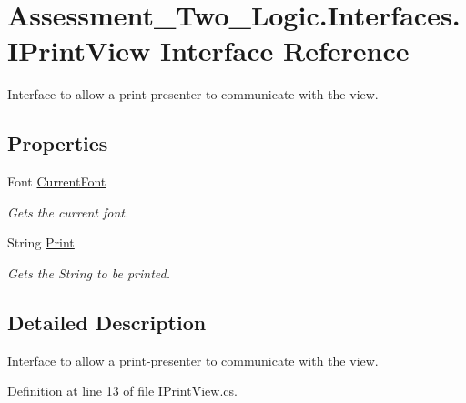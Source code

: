 \hypertarget{interface_assessment___two___logic_1_1_interfaces_1_1_i_print_view}{
\section{Assessment\_\-Two\_\-Logic.Interfaces.IPrintView Interface Reference}
\label{interface_assessment___two___logic_1_1_interfaces_1_1_i_print_view}
}


Interface to allow a print-\/presenter to communicate with the view.  


\subsection*{Properties}
\begin{DoxyCompactItemize}
\item 
Font \hyperlink{interface_assessment___two___logic_1_1_interfaces_1_1_i_print_view_a9368f6ee671be1c540a3d9240f03aed4}{CurrentFont}
\begin{DoxyCompactList}\small\item\em Gets the current font. \item\end{DoxyCompactList}\item 
String \hyperlink{interface_assessment___two___logic_1_1_interfaces_1_1_i_print_view_aae77c0c48f1acccf4fe91b8fd2cd265f}{Print}
\begin{DoxyCompactList}\small\item\em Gets the String to be printed. \item\end{DoxyCompactList}\end{DoxyCompactItemize}


\subsection{Detailed Description}
Interface to allow a print-\/presenter to communicate with the view. 

Definition at line 13 of file IPrintView.cs.



